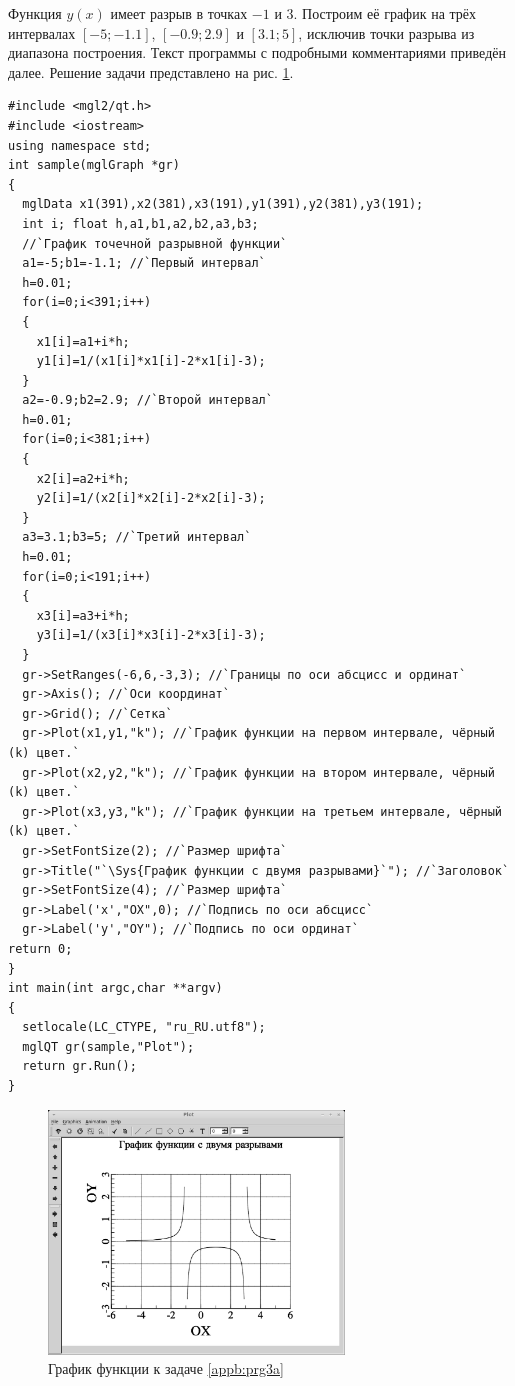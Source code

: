 
Функция $y(x)$ имеет разрыв в точках $-1$ и $3$. Построим её график на трёх интервалах $[-5;-1.1]$,
$[-0.9; 2.9]$ и $[3.1;5]$, исключив точки разрыва из диапазона построения. Текст программы с подробными комментариями
приведён далее. Решение задачи представлено на рис. \ref{appb:refDrawing3a}.
\begin{lstlisting}
#include <mgl2/qt.h>
#include <iostream>
using namespace std;
int sample(mglGraph *gr)
{  
  mglData x1(391),x2(381),x3(191),y1(391),y2(381),y3(191);
  int i; float h,a1,b1,a2,b2,a3,b3;
  //`График точечной разрывной функции`
  a1=-5;b1=-1.1; //`Первый интервал`
  h=0.01;
  for(i=0;i<391;i++)
  {
    x1[i]=a1+i*h;
    y1[i]=1/(x1[i]*x1[i]-2*x1[i]-3);
  }
  a2=-0.9;b2=2.9; //`Второй интервал`
  h=0.01;
  for(i=0;i<381;i++)
  {
    x2[i]=a2+i*h;
    y2[i]=1/(x2[i]*x2[i]-2*x2[i]-3);
  }
  a3=3.1;b3=5; //`Третий интервал`
  h=0.01;
  for(i=0;i<191;i++)
  {
    x3[i]=a3+i*h;
    y3[i]=1/(x3[i]*x3[i]-2*x3[i]-3);
  }
  gr->SetRanges(-6,6,-3,3); //`Границы по оси абсцисс и ординат`
  gr->Axis(); //`Оси координат`
  gr->Grid(); //`Сетка`
  gr->Plot(x1,y1,"k"); //`График функции на первом интервале, чёрный (k) цвет.`
  gr->Plot(x2,y2,"k"); //`График функции на втором интервале, чёрный (k) цвет.`
  gr->Plot(x3,y3,"k"); //`График функции на третьем интервале, чёрный (k) цвет.`
  gr->SetFontSize(2); //`Размер шрифта`
  gr->Title("`\Sys{График функции c двумя разрывами}`"); //`Заголовок`
  gr->SetFontSize(4); //`Размер шрифта`
  gr->Label('x',"OX",0); //`Подпись по оси абсцисс`
  gr->Label('y',"OY"); //`Подпись по оси ординат`
return 0;
}
int main(int argc,char **argv)
{
  setlocale(LC_CTYPE, "ru_RU.utf8");
  mglQT gr(sample,"Plot");
  return gr.Run();
}
\end{lstlisting}

\begin{figure}[htb]
\begin{center}
\includegraphics[width=0.7\textwidth]{img/ris_appb_9}
\caption{График функции к задаче \ref{appb:prg3a}}
\label{appb:refDrawing3a}
\end{center}
\end{figure}

